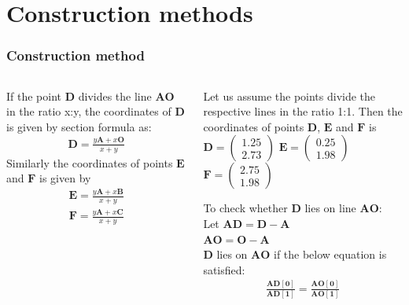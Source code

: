 \documentclass{beamer}
\renewcommand{\vec}[1]{\mathbf{#1}}
\begin{document}
\section*{Construction methods}
\begin{frame}[fragile]
\footnotesize
\frametitle{Construction method}
\begin{columns}
\begin{column}{0.5\textwidth}

 If the point $\vec{D}$ divides the line $\vec{AO}$ in the ratio x:y, the coordinates of $\vec{D}$ is given by section formula as:
\begin{align} \vec{D} = \frac{y\vec{A} + x\vec{O}}{x+y}\end{align}
Similarly the coordinates of points $\vec{E}$ and $\vec{F}$ is given by
\begin{align} \vec{E} = \frac{y\vec{A} + x\vec{B}}{x+y}\end{align}
\begin{align} \vec{F} = \frac{y\vec{A} + x\vec{C}}{x+y}\end{align}

 \end{column}
 
 
\begin{column}{0.5\textwidth} 
Let us assume the points divide the respective lines in the ratio 1:1. Then the coordinates of points $\vec{D}$, $\vec{E}$ and $\vec{F}$ is \\
 \quad $ \vec{D}= \begin{pmatrix}1.25\\2.73\end{pmatrix}$\quad
    \quad $\vec{E}=\begin{pmatrix}0.25\\1.98\end{pmatrix}$\quad
    \quad $\vec{F}=\begin{pmatrix}2.75\\1.98\end{pmatrix}$\quad
    

To check whether $\vec{D}$ lies on line $\vec{AO}$:\\
Let $\vec{AD} = \vec{D} - \vec{A}$\\
$\vec{AO} = \vec{O} - \vec{A}$\\
$\vec{D}$ lies on $\vec{AO}$ if the below equation is satisfied:
\begin{align}
\frac{\vec{AD[0]}}{\vec{AD[1]}} = \frac{\vec{AO[0]}}{\vec{AO[1]}}
\end{align}


\end{column}
\end{columns}
\end{frame}
\end{document}
